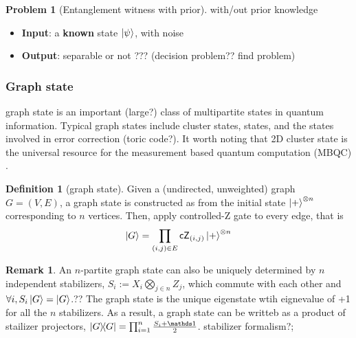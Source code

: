 \documentclass[
10pt,
aps,
pra,
linenumbers,
floatfix,
]{revtex4-2}
\theoremstyle{plain}
\theoremstyle{definition}
\newtheorem{definition}{Definition}
\newtheorem{remark}{Remark}
\newtheorem{problem}{Problem}
\begin{document}
\begin{problem}[Entanglement witness with prior]
	with/out prior knowledge
	\begin{itemize}
		\item \textbf{Input}: a \textbf{known} state $\ket{\psi}$, with noise
		\item \textbf{Output}: separable or not ???
		(decision problem?? find problem)
	\end{itemize}
\end{problem}

\subsubsection{Graph state}
graph state is an important (large?) class of multipartite states in quantum information.
Typical graph states include cluster states,  states, and the states involved in error correction (toric code?).
It worth noting that 2D cluster state is the universal resource for the measurement based quantum computation (MBQC) \cite{briegelMeasurementbasedQuantumComputation2009}.
\begin{definition}[graph state]\label{def:graph_state}
	Given a (undirected, unweighted) graph $G=(V,E)$, a graph state is constructed as 
	from the initial state $\ket{+}^{\otimes n}$ corresponding to $n$ vertices.
	Then, apply controlled-Z gate to every edge, that is 
	\begin{equation}
		\ket{G}=\prod_{(i,j)\in E}\textsf{cZ}_{(i,j)} \ket{+}^{\otimes n}
	\end{equation}
\end{definition}
\begin{remark}
	An $n$-partite graph state can also be uniquely determined by $n$ independent stabilizers, 
	$S_i:= X_i \bigotimes_{j\in n}Z_j$, 
	which commute with each other and $\forall i,S_i\ket{G}=\ket{G}$.??
	The graph state is the unique eigenstate wtih eignevalue of +1 for all the $n$ stabilizers.
	As a result, a graph state can be writteb as a product of stailizer projectors, $\op{G}=\prod_{i=1}^n \frac{S_i +\identity}{2}$.
	stabilizer formalism?; 
\end{remark}
\end{document}
